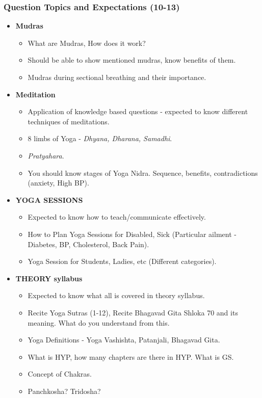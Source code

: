 \begin{frame}[fragile]\frametitle{Question Topics and Expectations (10-13)}
    \begin{itemize}
        \item \textbf{Mudras}
        \begin{itemize}
            \item What are Mudras, How does it work?
            \item Should be able to show mentioned mudras, know benefits of them.
            \item Mudras during sectional breathing and their importance.
        \end{itemize}
        \item \textbf{Meditation}
        \begin{itemize}
            \item Application of knowledge based questions - expected to know different techniques of meditations.
            \item 8 limbs of Yoga - \textit{Dhyana, Dharana, Samadhi}.
            \item \textit{Pratyahara}.
            \item You should know stages of Yoga Nidra. Sequence, benefits, contradictions (anxiety, High BP).
        \end{itemize}
        \item \textbf{YOGA SESSIONS}
        \begin{itemize}
            \item Expected to know how to teach/communicate effectively.
            \item How to Plan Yoga Sessions for Disabled, Sick (Particular ailment - Diabetes, BP, Cholesterol, Back Pain).
            \item Yoga Session for Students, Ladies, etc (Different categories).
        \end{itemize}
        \item \textbf{THEORY syllabus}
        \begin{itemize}
            \item Expected to know what all is covered in theory syllabus.
            \item Recite Yoga Sutras (1-12), Recite Bhagavad Gita Shloka 70 and its meaning. What do you understand from this.
            \item Yoga Definitions - Yoga Vashishta, Patanjali, Bhagavad Gita.
            \item What is HYP, how many chapters are there in HYP. What is GS.
            \item Concept of Chakras.
            \item Panchkosha? Tridosha?
        \end{itemize}
    \end{itemize}
\end{frame}











